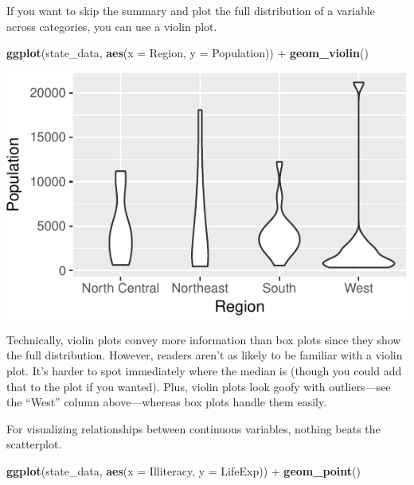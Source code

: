 \documentclass[12pt,oneside,openany]{tufte-book}
\newenvironment{Shaded}{}{}
\newcommand{\KeywordTok}[1]{\textcolor[rgb]{0.00,0.44,0.13}{\textbf{{#1}}}}
\newcommand{\DataTypeTok}[1]{\textcolor[rgb]{0.56,0.13,0.00}{{#1}}}
\newcommand{\StringTok}[1]{\textcolor[rgb]{0.25,0.44,0.63}{{#1}}}
\newcommand{\NormalTok}[1]{{#1}}
\begin{document}
If you want to skip the summary and plot the full distribution of a
variable across categories, you can use a violin plot.

\begin{Shaded}
\begin{Highlighting}[]
\KeywordTok{ggplot}\NormalTok{(state_data, }\KeywordTok{aes}\NormalTok{(}\DataTypeTok{x =} \NormalTok{Region, }\DataTypeTok{y =} \NormalTok{Population)) +}\StringTok{ }
\StringTok{    }\KeywordTok{geom_violin}\NormalTok{()}
\end{Highlighting}
\end{Shaded}

\includegraphics{pdaps_files/figure-latex/violin-1}

Technically, violin plots convey more information than box plots since
they show the full distribution. However, readers aren't as likely to be
familiar with a violin plot. It's harder to spot immediately where the
median is (though you could add that to the plot if you wanted). Plus,
violin plots look goofy with outliers---see the ``West'' column
above---whereas box plots handle them easily.

For visualizing relationships between continuous variables, nothing
beats the scatterplot.

\begin{Shaded}
\begin{Highlighting}[]
\KeywordTok{ggplot}\NormalTok{(state_data, }\KeywordTok{aes}\NormalTok{(}\DataTypeTok{x =} \NormalTok{Illiteracy, }\DataTypeTok{y =} \NormalTok{LifeExp)) +}\StringTok{ }
\StringTok{    }\KeywordTok{geom_point}\NormalTok{()}
\end{Highlighting}
\end{Shaded}
\end{document}
